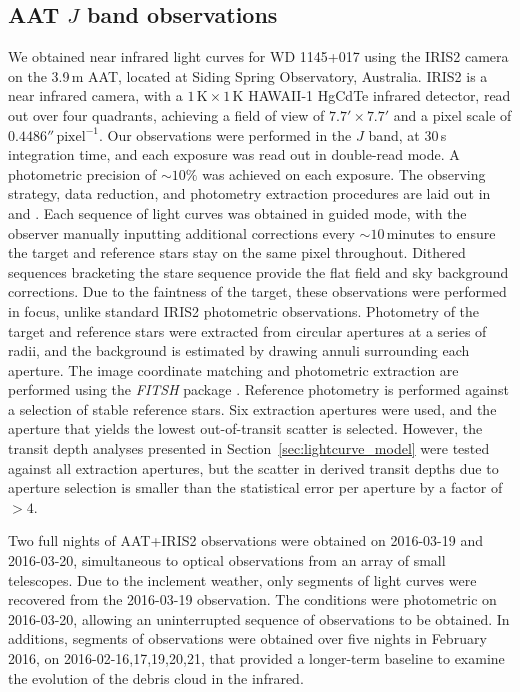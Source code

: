 \documentclass[iop,useAMES,usenatbig]{emulateapj}
\begin{document}
\subsection{AAT $J$ band observations}
\label{sec:obs_aat}

We obtained near infrared light curves for WD 1145+017 using the IRIS2 camera on the 3.9\,m AAT, located at Siding Spring Observatory, Australia. IRIS2 is a near infrared camera, with a $1\,\mathrm{K} \times 1\,\mathrm{K}$ HAWAII-1 HgCdTe infrared detector, read out over four quadrants, achieving a field of view of $7.7' \times 7.7 '$ and a pixel scale of $0.4486''\,\mathrm{pixel}^{-1}$. Our observations were performed in the $J$ band, at 30\,s integration time, and each exposure was read out in double-read mode. A photometric precision of $\sim 10\mathrm{\%}$ was achieved on each exposure. The observing strategy, data reduction, and photometry extraction procedures are laid out in \citet{2014MNRAS.445.2746Z} and \citet{2015MNRAS.454.3002Z}. Each sequence of light curves was obtained in guided mode, with the observer manually inputting additional corrections every $\sim 10$\,minutes to ensure the target and reference stars stay on the same pixel throughout. Dithered sequences bracketing the stare sequence provide the flat field and sky background corrections. Due to the faintness of the target, these observations were performed in focus, unlike standard IRIS2 photometric observations. Photometry of the target and reference stars were extracted from circular apertures at a series of radii, and the background is estimated by drawing annuli surrounding each aperture. The image coordinate matching and photometric extraction are performed using the \emph{FITSH} package \citep{2012MNRAS.421.1825P}. Reference photometry is performed against a selection of stable reference stars. Six extraction apertures were used, and the aperture that yields the lowest out-of-transit scatter is selected. However, the transit depth analyses presented in Section~\ref{sec:lightcurve_model} were tested against all extraction apertures, but the scatter in derived transit depths due to aperture selection is smaller than the statistical error per aperture by a factor of $>4$. 

Two full nights of AAT+IRIS2 observations were obtained on 2016-03-19 and 2016-03-20, simultaneous to optical observations from an array of small telescopes. Due to the inclement weather, only segments of light curves were recovered from the 2016-03-19 observation. The conditions were photometric on 2016-03-20, allowing an uninterrupted sequence of observations to be obtained. In additions, segments of observations were obtained over five nights in February 2016, on 2016-02-16,17,19,20,21, that provided a longer-term baseline to examine the evolution of the debris cloud in the infrared.
\end{document}

